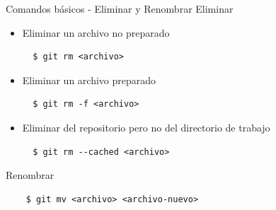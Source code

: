 \begin{frame}[fragile]{Comandos básicos - Eliminar y Renombrar}
  \alert{Eliminar}
  \begin{itemize}
    \item Eliminar un archivo no preparado \warnning
    \begin{verbatim}
  $ git rm <archivo>
    \end{verbatim}
    \item Eliminar un archivo preparado \warnning
    \begin{verbatim}
  $ git rm -f <archivo>
    \end{verbatim}
    \item Eliminar del repositorio pero no del directorio de trabajo
    \begin{verbatim}
  $ git rm --cached <archivo>
    \end{verbatim}
  \end{itemize}

  \alert{Renombrar}
  \begin{verbatim}
    $ git mv <archivo> <archivo-nuevo>
  \end{verbatim}

\end{frame}
